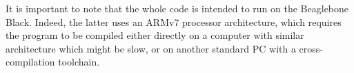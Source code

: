 It is important to note that the whole code is intended to run on the Beaglebone Black. Indeed, the latter uses an ARMv7 processor architecture, which requires the program to be compiled either directly on a computer with similar architecture which might be slow, or on another standard PC with a cross-compilation toolchain.
\\\\